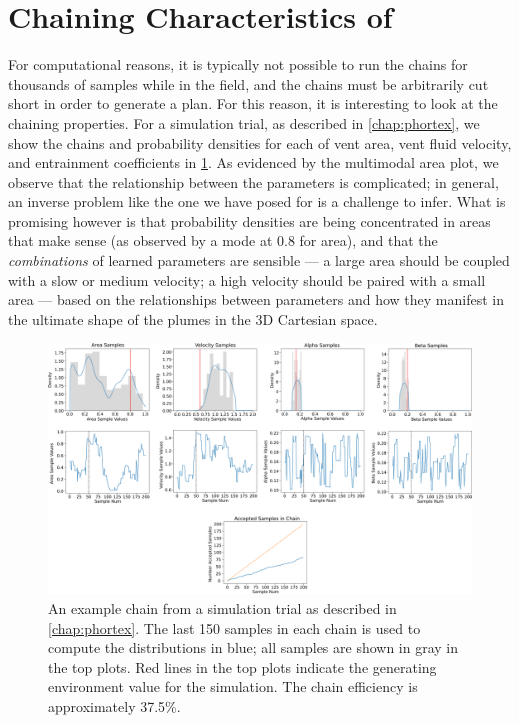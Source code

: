 \section{Chaining Characteristics of \PHUMES}
For computational reasons, it is typically not possible to run the chains for thousands of samples while in the field, and the chains must be arbitrarily cut short in order to generate a plan. For this reason, it is interesting to look at the chaining properties. For a simulation trial, as described in \cref{chap:phortex}, we show the chains and probability densities for each of vent area, vent fluid velocity, and entrainment coefficients in \cref{fig:phumes_sim_chain}. As evidenced by the multimodal area plot, we observe that the relationship between the parameters is complicated; in general, an inverse problem like the one we have posed for \PHUMES is a challenge to infer. What is promising however is that probability densities are being concentrated in areas that make sense (as observed by a mode at 0.8 for area), and that the \emph{combinations} of learned parameters are sensible --- a large area should be coupled with a slow or medium velocity; a high velocity should be paired with a small area --- based on the relationships between parameters and how they manifest in the ultimate shape of the plumes in the 3D Cartesian space.

\begin{figure}[h!]
    \centering
    \includegraphics[width=1\columnwidth]{figures/phumes_trial_chain.png}
    \caption[\PHUMES simulation chain]{An example chain from a simulation trial as described in \cref{chap:phortex}. The last 150 samples in each chain is used to compute the distributions in blue; all samples are shown in gray in the top plots. Red lines in the top plots indicate the generating environment value for the simulation. The chain efficiency is approximately 37.5\%.}
    \label{fig:phumes_sim_chain}
\end{figure}

